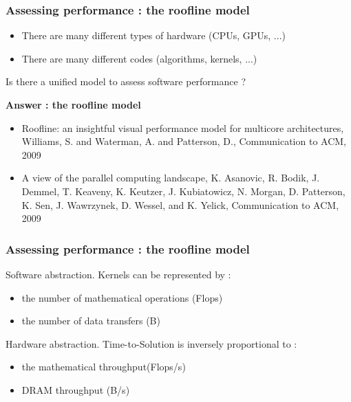 \begin{frame}[containsverbatim]
\frametitle{Assessing performance : the roofline model}
\begin{itemize}
\item There are many different types of hardware (CPUs, GPUs, ...)
\item There are many different codes (algorithms, kernels, ...)
\end{itemize}
Is there a unified model to assess software performance ?
\vfill
\begin{center}
\textbf{Answer : the roofline model}
\end{center}
\vfill
{\tiny
\begin{itemize}
\item Roofline: an insightful visual performance model for multicore architectures, Williams, S. and Waterman, A. and Patterson, D.,
Communication to ACM, 2009
\item A view of the parallel computing landscape, K. Asanovic, R. Bodik, J. Demmel, T. Keaveny, K. Keutzer, J. Kubiatowicz, N. Morgan, D.
Patterson, K. Sen, J. Wawrzynek, D. Wessel, and K. Yelick, Communication to ACM, 2009
\end{itemize}
}


\end{frame}


\begin{frame}[containsverbatim]
\frametitle{Assessing performance : the roofline model}
Software abstraction. Kernels can be represented by :
\begin{itemize}
\item the number of mathematical operations (Flops)
\item the number of data transfers (B)
\end{itemize}
\vfill
Hardware abstraction. Time-to-Solution is inversely proportional to :
\begin{itemize}
\item the mathematical throughput(Flops/s)
\item DRAM throughput (B/s)
\end{itemize}
\end{frame}


